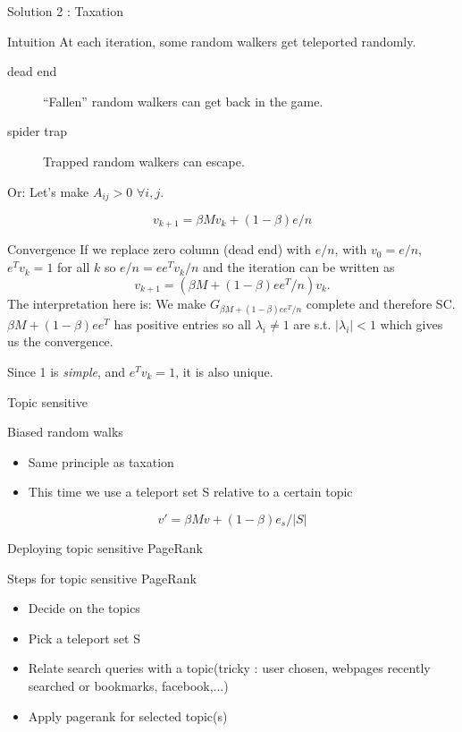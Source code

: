 \documentclass[10pt]{beamer}
\begin{document}
\begin{frame}[allowframebreaks]{Solution 2 : Taxation}
  \begin{block}{Intuition}
    At each iteration, some random walkers get teleported randomly.
    \begin{description}
      \item[dead end] ``Fallen'' random walkers can get back in the game.
      \item[spider trap] Trapped random walkers can escape.
    \end{description}

    Or: Let's make $A_{ij} > 0$ $\forall i,j$. %
  \end{block}
  $$v_{k+1} = \beta M v_k + (1 - \beta) e/n$$
  \begin{block}{Convergence}
    If we replace zero column (dead end) with $e/n$, with $v_0 = e/n$, $e^T v_k = 1$ for all $k$
    so $e/n = ee^Tv_k/n$ and the iteration can be written as
    $$v_{k+1} = (\beta M + (1 - \beta) ee^T/n) v_k.$$
    The interpretation here is: We make $G_{\beta M + (1 - \beta) ee^T/n}$ complete and therefore SC.
    $\beta M + (1-\beta) ee^T$ has positive entries so all $\lambda_i \neq 1$ are s.t. $|\lambda_i| < 1$
    which gives us the convergence.

    Since 1 is \emph{simple}, and $e^T v_k = 1$, it is also unique.
  \end{block}

\end{frame}

\begin{frame}{Topic sensitive}
  \begin{block}{Biased random walks}
    \begin{itemize}
      \item Same principle as taxation
      \item This time we use a teleport set S relative to a certain topic
    \end{itemize}
    $$ v' = \beta Mv + (1-\beta)e_s/|S|$$
  \end{block}
\end{frame}


\begin{frame}{Deploying topic sensitive PageRank}
  \begin{block}{Steps for topic sensitive PageRank}
    \begin{itemize}
      \item Decide on the topics
      \item Pick a teleport set S
      \item Relate search queries with a topic(tricky : user chosen, webpages recently searched or bookmarks, facebook,...)
      \item Apply pagerank for selected topic(s)
    \end{itemize}
  \end{block}
\end{frame}
\end{document}
